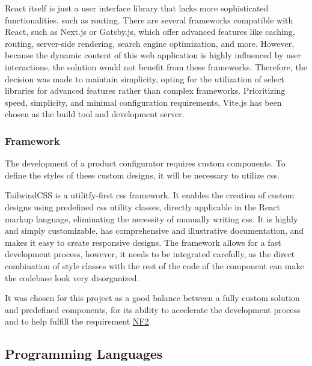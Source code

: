 React itself is just a user interface library that lacks more sophisticated functionalities, such as routing. There are several frameworks compatible with React, such as Next.js or Gatsby.js, which offer advanced features like caching, routing, server-side rendering, search engine optimization, and more. However, because the dynamic content of this web application is highly influenced by user interactions, the solution would not benefit from these frameworks. \cite{Eze2023} Therefore, the decision was made to maintain simplicity, opting for the utilization of select libraries for advanced features rather than complex frameworks. Prioritizing speed, simplicity, and minimal configuration requirements, Vite.js has been chosen as the build tool and development server. \cite{Said2023}


\subsubsection{ Framework}

The development of a product configurator requires custom components. To define the styles of these custom designs, it will be necessary to utilize \acrfull{css}.

TailwindCSS is a utilitfy-first \acrshort{css} framework. It enables the creation of custom designs using predefined \acrshort{css} utility classes, directly applicable in the React markup language, eliminating the necessity of manually writing \acrshort{css}. It is highly and simply customizable, has comprehensive and illustrative documentation, and makes it easy to create responsive designs. The framework allows for a fast development process, however, it needs to be integrated carefully, as the direct combination of style classes with the rest of the code of the component can make the codebase look very disorganized. \cite{TailwindCSS}

It was chosen for this project as a good balance between a fully custom solution and predefined components, for its ability to accelerate the development process and to help fulfill the requirement \hyperref[itm:NF2]{NF2}.


\subsection{Programming Languages}

